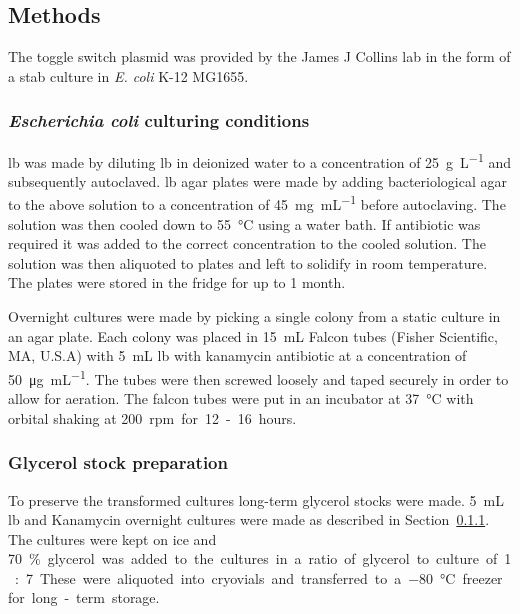 \subsection{Methods}

The toggle switch plasmid was provided by the James J Collins lab in the form of a stab culture in \textit{E. coli} K-12 MG1655.

\subsubsection{\textit{Escherichia coli} culturing conditions}
\label{sec:overnigh_cult}

\acrfull{lb} was made by diluting \acrshort{lb} in deionized water to a concentration of \SI{25}{\gram\per\liter} and subsequently autoclaved. \acrshort{lb} agar plates were made by adding bacteriological agar to the above solution to a concentration of \SI{45}{\milli\gram\per\milli\liter} before autoclaving. The solution was then cooled down to \SI{55}{\celsius} using a water bath. If antibiotic was required it was added to the correct concentration to the cooled solution. The solution was then aliquoted to plates and left to solidify in room temperature. The plates were stored in the fridge for up to 1 month. 


Overnight cultures were made by picking a single colony from a static culture in an agar plate. Each colony was placed in \SI{15}{\milli\liter} Falcon tubes (Fisher Scientific, MA, U.S.A) with \SI{5}{\milli\liter} \acrshort{lb} with kanamycin antibiotic at a concentration of \SI{50}{\micro\gram\per\milli\liter}. The tubes were then screwed loosely and taped securely in order to allow for aeration. The falcon tubes were put in an incubator at \SI{37}{\celsius} with orbital shaking at \SI{200} rpm for 12-16 hours. 

\subsubsection{Glycerol stock preparation}
\label{sec:glycerol_stock}
To preserve the transformed cultures long-term glycerol stocks were made. \SI{5}{\milli\liter} \acrshort{lb} and Kanamycin overnight cultures were made as described in Section~\ref{sec:overnigh_cult}. The cultures were kept on ice and \SI{70}\% glycerol was added to the cultures in a ratio of glycerol to culture of 1:7. These were aliquoted into cryovials and transferred to a \SI{-80}{\celsius} freezer for long-term storage.


